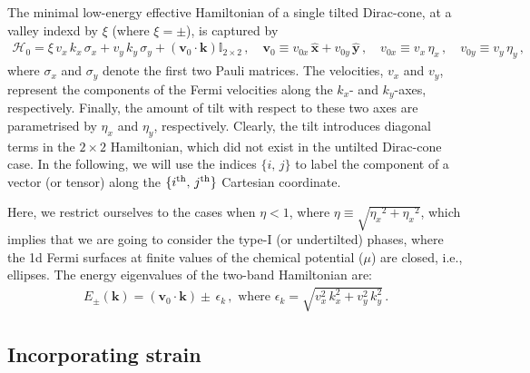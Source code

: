 \documentclass[aps,prb, onecolumn,nofootinbib,citeautoscript,10pt]{revtex4-2}
\begin{document}

The minimal low-energy effective Hamiltonian of a single tilted Dirac-cone, at a valley indexd by $\xi $ (where $\xi =\pm$), is captured by~\cite{tilted-goerbig, ips_tilted_dirac}
\begin{align}
\label{eqham}
\mathcal{H}_0 =   \xi\, v_x\, k_x \,\sigma_x +    v_y \, k_y \,\sigma_y
+ \left ( \boldsymbol{v}_0 \cdot\boldsymbol{k} \right ) {\mathbb I}_{2\times 2} \,, \quad
\boldsymbol{v}_0 \equiv  
v_{0x} \,   {\boldsymbol{\hat x}} +  v_{0y} \,  {\boldsymbol{\hat y}}\,, \quad
v_{0x} \equiv   v_x\,\eta_x \, ,\quad
v_{0y} \equiv  v_y\,\eta_y \,,
\end{align}
where $\sigma_x $ and $\sigma_y $ denote the first two Pauli matrices. The velocities, $v_x$ and $v_y$, represent the components of the Fermi velocities along the $k_x$- and $k_y$-axes, respectively. Finally, the amount of tilt with respect to these two axes
are parametrised by $\eta_x$ and $\eta_y$, respectively. Clearly, the tilt introduces diagonal terms in the $2\times 2$ Hamiltonian, which did not exist in the untilted Dirac-cone case.
In the following, we will use the indices $\lbrace i, \, j \rbrace $ to label the component of a vector (or tensor) along the $
\lbrace i^{\rm th}, \, j^{\rm th} \rbrace$ Cartesian coordinate.


Here, we restrict ourselves to the cases when $ \eta <1$, where $\eta  \equiv \sqrt{ {\eta_x}^2 + {\eta_x}^2  }$, which implies that we are going to consider the type-I (or undertilted) phases, where the 1d Fermi surfaces at finite values of the chemical potential ($\mu$) are closed, i.e., ellipses. The energy eigenvalues of the two-band Hamiltonian are:
\begin{align}
E_{\pm} ({\boldsymbol k}) = (\boldsymbol{v}_0 \cdot \boldsymbol{k} )
 \pm \, \epsilon_k \,, \text{ where } 
\epsilon_k = \sqrt{ v^2_x \, k^2_x + v^2_y \, k^2_y } \,.
\end{align}


\subsection{Incorporating strain}
\end{document}
